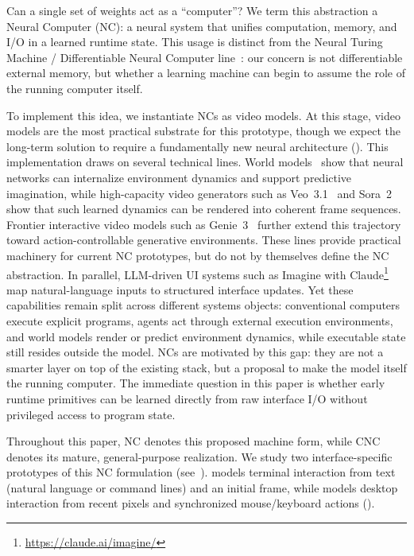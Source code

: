 Can a single set of weights act as a ``computer''?  
We term this abstraction a Neural Computer (NC): a neural system that unifies computation, memory, and I/O in a learned runtime state.
This usage is distinct from the Neural Turing Machine / Differentiable Neural Computer line~\citep{graves2014neural,graves2016hybrid}: our concern is not differentiable external memory, but whether a learning machine can begin to assume the role of the running computer itself.

To implement this idea, we instantiate NCs as video models.
At this stage, video models are the most practical substrate for this prototype, though we expect the long-term solution to require a fundamentally new neural architecture ().
This implementation draws on several technical lines. World models~\citep{ha2018world} show that neural networks can internalize environment dynamics and support predictive imagination, while high-capacity video generators such as Veo~3.1~\citep{google_veo3_1_2025} and Sora~2~\citep{openai_sora2_2025} show that such learned dynamics can be rendered into coherent frame sequences.
Frontier interactive video models such as Genie~3~\citep{bruce2024genie} further extend this trajectory toward action-controllable generative environments. These lines provide practical machinery for current NC prototypes, but do not by themselves define the NC abstraction.
In parallel, LLM-driven UI systems such as Imagine with Claude\footnote{\url{https://claude.ai/imagine/}} map natural-language inputs to structured interface updates. 
Yet these capabilities remain split across different systems objects: conventional computers execute explicit programs, agents act through external execution environments, and world models render or predict environment dynamics, while executable state still resides outside the model.
NCs are motivated by this gap: they are not a smarter layer on top of the existing stack, but a proposal to make the model itself the running computer.
The immediate question in this paper is whether early runtime primitives can be learned directly from raw interface I/O without privileged access to program state.

Throughout this paper, NC denotes this proposed machine form, while CNC denotes its mature, general-purpose realization.
We study two interface-specific prototypes of this NC formulation (see~).
\nccligen{} models terminal interaction from text (natural language or command lines) and an initial frame, while \ncguiworld{} models desktop interaction from recent pixels and synchronized mouse/keyboard actions ().

